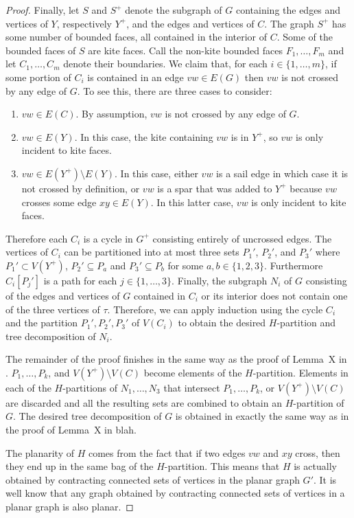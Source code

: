 \documentclass{patmorin}
\begin{document}
\begin{proof}
  
  Finally, let $S$ and $S^+$ denote the subgraph of $G$ containing the edges and vertices of $Y$, respectively $Y^+$, and the edges and vertices of $C$.  The graph $S^+$ has some number of bounded faces, all contained in the interior of $C$. Some of the bounded faces of $S$ are kite faces. Call the non-kite bounded faces $F_1,\ldots,F_m$ and let $C_1,\ldots,C_m$ denote their boundaries.  We claim that, for each $i\in\{1,\ldots,m\}$, if some portion of $C_i$ is contained in an edge $vw\in E(G)$ then $vw$ is not crossed by any edge of $G$.  To see this, there are three cases to consider:
  \begin{enumerate}
    \item $vw\in E(C)$. By assumption, $vw$ is not crossed by any edge of $G$.
    \item $vw\in E(Y)$. In this case, the kite containing $vw$ is in $Y^+$, so $vw$ is only incident to kite faces.
    \item $vw\in E(Y^+)\setminus E(Y)$. In this case, either $vw$ is a sail edge in which case it is not crossed by definition, or $vw$ is a spar that was added to $Y^+$ because $vw$ crosses some edge $xy\in E(Y)$.  In this latter case, $vw$ is only incident to kite faces.
  \end{enumerate}
  Therefore each $C_i$ is a cycle in $G^+$ consisting entirely of uncrossed edges. The vertices of $C_i$ can be partitioned into at most three sets $P_1'$, $P_2'$, and $P_3'$ where $P_1'\subset V(Y^+)$, $P_2'\subseteq P_a$ and $P_3'\subseteq P_b$ for some $a,b\in\{1,2,3\}$. Furthermore $C_i[P_j']$ is a path for each $j\in\{1,\ldots,3\}$. Finally, the subgraph $N_i$ of $G$ consisting of the edges and vertices of $G$ contained in $C_i$ or its interior does not contain one of the three vertices of $\tau$. Therefore, we can apply induction using the cycle $C_i$ and the partition $P_1',P_2',P_3'$ of $V(C_i)$ to obtain the desired $H$-partition and tree decomposition of $N_i$.
  
  The remainder of the proof finishes in the same way as the proof of Lemma~X in \cite{dujmovic.joret.ea:planar}.  $P_1,\ldots,P_k$, and $V(Y^+)\setminus V(C)$ become elements of the $H$-partition.  Elements in each of the $H$-partitions of $N_1,\ldots,N_3$ that intersect $P_1,\ldots,P_k$, or $V(Y^+)\setminus V(C)$ are discarded and all the resulting sets are combined to obtain an $H$-partition of $G$.  The desired tree decomposition of $G$ is obtained in exactly the same way as in the proof of Lemma~X in blah.
  
  The planarity of $H$ comes from the fact that if two edges $vw$ and $xy$ cross, then they end up in the same bag of the $H$-partition.  This means that $H$ is actually obtained by contracting connected sets of vertices in the planar graph $G'$.  It is well know that any graph obtained by contracting connected sets of vertices in a planar graph is also planar.
\end{proof}
\end{document}
